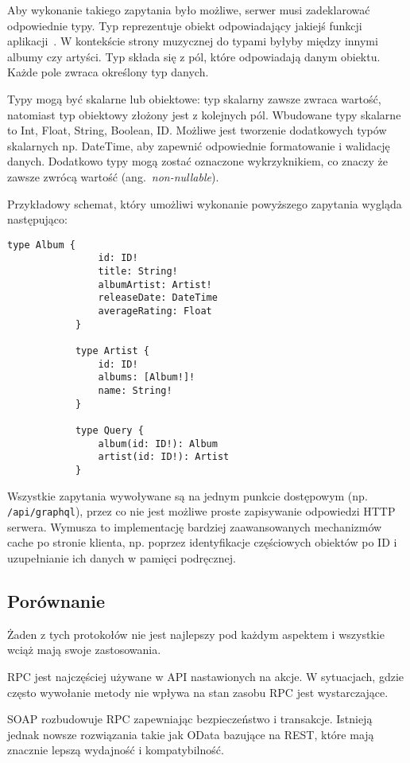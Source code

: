 		Aby wykonanie takiego zapytania było możliwe, serwer musi zadeklarować odpowiednie typy.
		Typ reprezentuje obiekt odpowiadający jakiejś funkcji aplikacji~\cite{GraphQL}.
		W kontekście strony muzycznej do typami byłyby między innymi albumy czy artyści.
		Typ składa się z pól, które odpowiadają danym obiektu.
		Każde pole zwraca określony typ danych.

		Typy mogą być skalarne lub obiektowe: typ skalarny zawsze zwraca wartość, natomiast typ obiektowy złożony jest z kolejnych pól.
		Wbudowane typy skalarne to Int, Float, String, Boolean, ID.
		Możliwe jest tworzenie dodatkowych typów skalarnych np. DateTime, aby zapewnić odpowiednie formatowanie i walidację danych.
		Dodatkowo typy mogą zostać oznaczone wykrzyknikiem, co znaczy że zawsze zwrócą wartość (ang.\ \emph{non-nullable}).
		
		Przykładowy schemat, który umożliwi wykonanie powyższego zapytania wygląda następująco:
		
		\begin{lstlisting}[label=lst:gqlSchema]
			type Album {
				id: ID!
				title: String!
				albumArtist: Artist!
				releaseDate: DateTime
				averageRating: Float
			}

			type Artist {
				id: ID!
				albums: [Album!]!
				name: String!
			}

			type Query {
				album(id: ID!): Album
				artist(id: ID!): Artist
			}
		\end{lstlisting}

		Wszystkie zapytania wywoływane są na jednym punkcie dostępowym (np. \verb|/api/graphql|),
		przez co nie jest możliwe proste zapisywanie odpowiedzi HTTP serwera.
		Wymusza to implementację bardziej zaawansowanych mechanizmów cache po stronie klienta,
		np. poprzez identyfikacje częściowych obiektów po ID i uzupełnianie ich danych w pamięci podręcznej.

	\subsection{Porównanie}
		Żaden z tych protokołów nie jest najlepszy pod każdym aspektem i wszystkie wciąż mają swoje zastosowania.

		RPC jest najczęściej używane w API nastawionych na akcje.
		W sytuacjach, gdzie często wywołanie metody nie wpływa na stan zasobu RPC jest wystarczające.

		SOAP rozbudowuje RPC zapewniając bezpieczeństwo i transakcje.
		Istnieją jednak nowsze rozwiązania takie jak OData bazujące na REST, które mają znacznie lepszą wydajność i kompatybilność.

